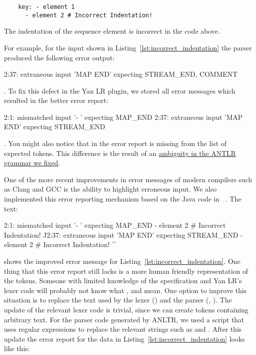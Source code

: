 \begin{listing}
  \begin{verbatim}
    key: - element 1
      - element 2 # Incorrect Indentation!
  \end{verbatim}
  \caption{The indentation of the sequence element  is incorrect in the code above.}
  \label{lst:incorrect_indentation}
\end{listing}

For example, for the input shown in Listing~\ref{lst:incorrect_indentation} the parser produced the following error output:

\begin{textcode}
  2:37: extraneous input 'MAP END' expecting {STREAM_END, COMMENT}
\end{textcode}

. To fix this defect in the Yan LR plugin, we stored all error messages which resulted in the better error report:

\begin{textcode}
  2:1: mismatched input '- ' expecting MAP_END
  2:37: extraneous input 'MAP END' expecting STREAM_END
\end{textcode}

. You might also notice that in the error report  is missing from the list of expected tokens. This difference is the result of an \href{https://github.com/ElektraInitiative/libelektra/commit/0fe4953}{ambiguity in the ANTLR grammar we fixed}.

One of the more recent improvements in error messages of modern compilers such as Clang and GCC is the ability to highlight erroneous input. We also implemented this error reporting mechanism based on the Java code in ~\cite{parr2013definitive}. The text:

\begin{textcode}
2:1: mismatched input '- ' expecting MAP_END
     - element 2 # Incorrect Indentation!
     ^^
2:37: extraneous input 'MAP END' expecting STREAM_END
      - element 2 # Incorrect Indentation!
                                          ^
\end{textcode}

shows the improved error message for Listing~\ref{lst:incorrect_indentation}. One thing that this error report still lacks is a more human friendly representation of the tokens. Someone with limited knowledge of the  specification and Yan LR’s lexer code will probably not know what ,  and  mean. One option to improve this situation is to replace the text used by the lexer () and the parser (, ). The update of the relevant lexer code is trivial, since we can create tokens containing arbitrary text. For the parser code generated by ANLTR, we used a script that uses regular expressions to replace the relevant strings such as  and . After this update the error report for the  data in Listing~\ref{lst:incorrect_indentation} looks like this:

